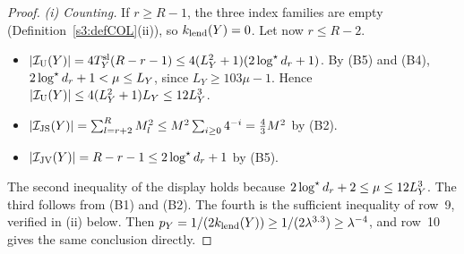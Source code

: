 \begin{proof}
\emph{(i) Counting.} If $r\ge R-1$, the three index families are empty
(Definition~\ref{s3:defCOL}(ii)), so $k_{\mathrm{lend}}(Y)=0$. Let now $r\le R-2$.
\begin{itemize}
\item $|\mathcal{I}_{\mathrm{U}}(Y)|=4T^{\mathrm{sl}}_Y(R-r-1)\le4(L_Y^2+1)(2\log^{\star} d_r+1)$. By (B5)
  and (B4), $2\log^{\star} d_r+1<\mu\le L_Y$, since $L_Y\ge103\mu-1$. Hence
  $|\mathcal{I}_{\mathrm{U}}(Y)|\le4(L_Y^2+1)L_Y\le12L_Y^3$.
\item $|\mathcal{I}_{\mathrm{JS}}(Y)|=\sum_{l=r+2}^RM_l^2\le M^2\sum_{i\ge0}4^{-i}=\frac43M^2$
  by (B2).
\item $|\mathcal{I}_{\mathrm{JV}}(Y)|=R-r-1\le2\log^{\star} d_r+1$ by (B5).
\end{itemize}
The second inequality of the display holds because $2\log^{\star} d_r+2\le\mu\le12L_Y^3$.
The third follows from (B1) and (B2). The fourth is the sufficient
inequality of row~9, verified in (ii) below.
Then $p_Y=1/(2k_{\mathrm{lend}}(Y))\ge1/(2\lambda^{3.3})\ge\lambda^{-4}$, and row~10
gives the same conclusion directly.


\end{proof}

